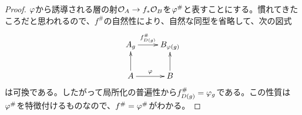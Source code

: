 \begin{proof}
  ${\varphi}$から誘導される層の射$\mathcal{O}_A \to f_*\mathcal{O}_B$を${\varphi}^{\#}$と表すことにする。慣れてきたころだと思われるので、$f^{\#}$の自然性により、自然な同型を省略して、次の図式
  \[
  \xymatrix{
  A_g \ar[r]^-{ f^{\#}_{D(g)} } & B_{\vp(g)} \\
  A \ar[u] \ar[r]^-{\vp} & B \ar[u]
  }
  \]
  は可換である。したがって局所化の普遍性から$f^{\#}_{D(g)} = {\varphi}_g$である。この性質は${\varphi}^{\#}$を特徴付けるものなので、$f^{\#} = {\varphi}^{\#}$がわかる。
\end{proof}
